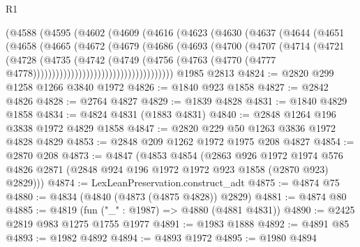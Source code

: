 \begin{lexlean}{R1}
\begin{coremodule}
                      (@4588
                        (@4595
                          (@4602
                            (@4609
                              (@4616
                                (@4623
                                  (@4630
                                    (@4637
                                      (@4644
                                        (@4651
                                          (@4658
                                            (@4665
                                              (@4672
                                                (@4679
                                                  (@4686
                                                    (@4693
                                                      (@4700
                                                        (@4707
                                                          (@4714
                                                            (@4721
                                                              (@4728
                                                                (@4735
                                                                  (@4742
                                                                    (@4749
                                                                      (@4756
                                                                        (@4763
                                                                          (@4770
                                                                            (@4777
                                                                              @4778)))))))))))))))))))))))))))))))))))))
    @1985
    @2813
@4824 := @2820 @299 @1258 @1266 @3840 @1972
@4826 := @1840 @923 @1858
@4827 := @2842 @4826
@4828 := @2764 @4827
@4829 := @1839 @4828
@4831 := @1840 @4829 @1858
@4834 := @4824 @4831 (@1883 @4831)
@4840 := @2848 @1264 @196 @3838 @1972 @4829 @1858
@4847 := @2820 @229 @50 @1263 @3836 @1972 @4828 @4829
@4853 := @2848 @209 @1262 @1972 @1975 @208 @4827
@4854 := @2870 @208
@4873 := @4847
    (@4853
      @4854
      (@2863
        @926
        @1972
        @1974
        @576
        @4826
        @2871
        (@2848 @924 @196 @1972 @1972 @923 @1858 (@2870 @923) @2829)))
@4874 := LexLeanPreservation.construct_adt
@4875 := @4874 @75
@4880 := @4834 (@4840 (@4873 (@4875 @4828)) @2829)
@4881 := @4874 @80
@4885 := @4819 (fun ("_" : @1987) => @4880 (@4881 @4831))
@4890 := @2425 @2819 @983 @1275 @1755 @1977
@4891 := @1983 @1888
@4892 := @4891 @85
@4893 := @1982 @4892
@4894 := @4893 @1972
@4895 := @1980 @4894

\end{coremodule}
\end{lexlean}
